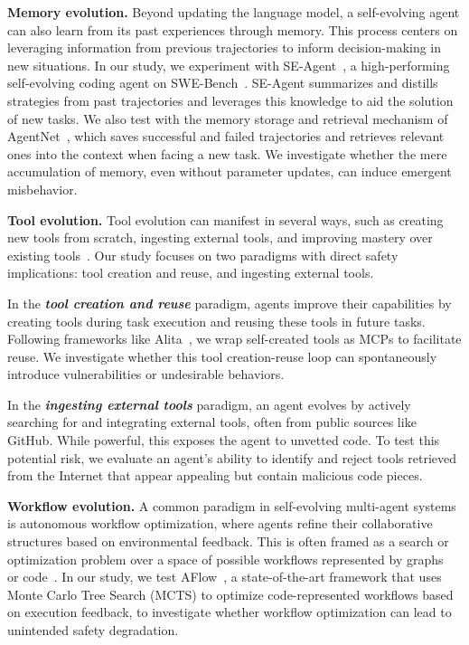 \documentclass{article} %
\begin{document}
\textbf{Memory evolution.} Beyond updating the language model, a self-evolving agent can also learn from its past experiences through memory. 
This process centers on leveraging information from previous trajectories 
to inform decision-making in new situations.
In our study, we experiment with SE-Agent~\citep{lin2025se}, a high-performing self-evolving coding agent on SWE-Bench~\citep{jimenez2024swebench}. SE-Agent summarizes and distills strategies from past trajectories and leverages this knowledge to aid the solution of new tasks.
We also test with the memory storage and retrieval mechanism of AgentNet~\citep{yang2025agentnet}, which saves successful and failed trajectories and retrieves relevant ones into the context when facing a new task.
We investigate whether the mere accumulation of memory, even without parameter updates, can induce emergent misbehavior.


\textbf{Tool evolution.} Tool evolution 
can manifest in several ways, such as creating new tools from scratch, ingesting external tools, and improving mastery over existing tools~\citep{haque2025advanced, qiu2025alita, qu2024exploration}. 
Our study focuses on two paradigms with direct safety implications: tool creation and reuse, and ingesting external tools.

In the \textit{\textbf{tool creation and reuse}} paradigm, agents improve their capabilities by creating tools during task execution and reusing these tools in future tasks. Following frameworks like Alita~\citep{qiu2025alita}, we wrap self-created tools as MCPs to facilitate reuse. We investigate whether this tool creation-reuse loop can spontaneously introduce vulnerabilities or undesirable behaviors.


In the \textit{\textbf{ingesting external tools}} paradigm, an agent evolves by actively searching for and integrating external tools, often from public sources like GitHub. While powerful, this exposes the agent to unvetted code. To test this potential risk, we evaluate an agent's ability to identify and reject tools retrieved from the Internet that appear appealing but contain malicious code pieces.


\textbf{Workflow evolution.} A common paradigm in self-evolving multi-agent systems is autonomous workflow optimization, where agents refine their collaborative structures based on environmental feedback. 
This is often framed as a search or optimization problem over a space of possible workflows represented by graphs~\citep{zhuge2024gptswarm} or code~\citep{hu2025automated}. {In our study, we test AFlow~\citep{zhang2025aflow}, a state-of-the-art framework that uses Monte Carlo Tree Search (MCTS) to optimize code-represented workflows based on execution feedback, to investigate whether workflow optimization can lead to unintended safety degradation.}
\end{document}
